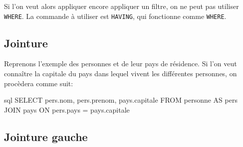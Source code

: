 \documentclass[a4paper]{scrartcl}
\begin{document}
			Si l'on veut alors appliquer encore appliquer un filtre, on ne peut pas utiliser \texttt{WHERE}.
			La commande à utiliser est \texttt{HAVING}, qui fonctionne comme \texttt{WHERE}.

		\subsection{Jointure}
			\semidef Reprenons l'exemple des personnes et de leur pays de résidence.
			Si l'on veut connaître la capitale du pays dans lequel vivent les différentes personnes, on procèdera comme suit:
			\begin{code}{sql}
				SELECT pers.nom, pers.prenom, pays.capitale
				FROM personne AS pers
				JOIN pays
				ON pers.pays = pays.capitale
			\end{code}

		\subsection{Jointure gauche}
\end{document}

